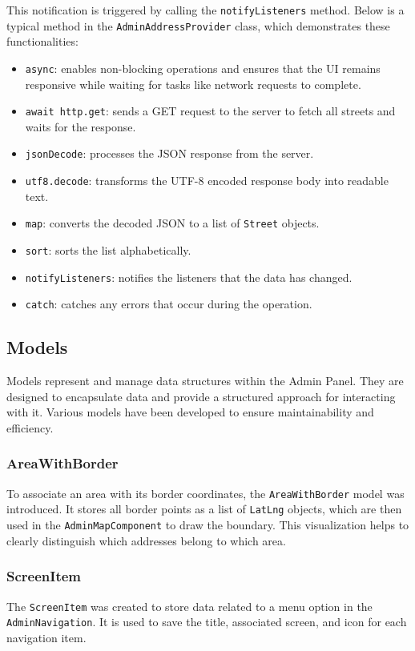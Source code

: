   This notification is triggered by calling the \texttt{notifyListeners} method. Below is a typical method in the \texttt{AdminAddressProvider} class, which demonstrates these functionalities:  
  

\begin{itemize}
    \item \texttt{async}: enables non-blocking operations and ensures that the UI remains responsive while waiting for tasks like network requests to complete.
    \item \texttt{await http.get}: sends a GET request to the server to fetch all streets and waits for the response.
    \item \texttt{jsonDecode}: processes the JSON response from the server.
    \item \texttt{utf8.decode}: transforms the UTF-8 encoded response body into readable text.
    \item \texttt{map}: converts the decoded JSON to a list of \texttt{Street} objects.
    \item \texttt{sort}: sorts the list alphabetically.
    \item \texttt{notifyListeners}: notifies the listeners that the data has changed.
    \item \texttt{catch}: catches any errors that occur during the operation.
\end{itemize}

\subsection{Models}
Models represent and manage data structures within the Admin Panel. They are designed to encapsulate data and provide a structured approach for interacting with it. Various models have been developed to ensure maintainability and efficiency.



\subsubsection{AreaWithBorder}
To associate an area with its border coordinates, the \texttt{AreaWithBorder} model was introduced. It stores all border points as a list of \texttt{LatLng} objects, which are then used in the \texttt{AdminMapComponent} to draw the boundary. This visualization helps to clearly distinguish which addresses belong to which area.


\subsubsection{ScreenItem}
\label{fig:ScreenItem}
The \texttt{ScreenItem} was created to store data related to a menu option in the \texttt{AdminNavigation}. It is used to save the title, associated screen, and icon for each navigation item.

